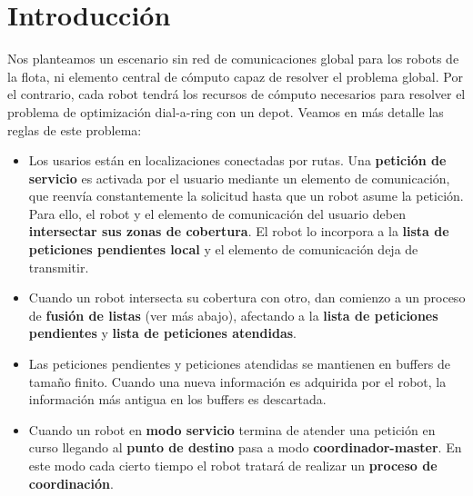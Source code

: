 \documentclass[preprint,12pt]{elsarticle}
\begin{document}
\linenumbers

\section{Introducción}

Nos planteamos un escenario sin red de comunicaciones global para los robots de la flota, ni elemento central de cómputo capaz de resolver el problema global. Por el contrario, cada robot tendrá los recursos de cómputo necesarios para resolver el problema de optimización dial-a-ring con un depot. Veamos en más detalle las reglas de este problema:

\begin{itemize}

\item Los usarios están en localizaciones conectadas por rutas. Una \textbf{petición de servicio} es activada por el usuario mediante un elemento de comunicación, que reenvía constantemente la solicitud hasta que un robot asume la petición. Para ello, el robot y el elemento de comunicación del usuario deben \textbf{intersectar sus zonas de cobertura}. El robot lo incorpora a la \textbf{lista de peticiones pendientes local} y el elemento de comunicación deja de transmitir.

\item Cuando un robot intersecta su cobertura con otro, dan comienzo a un proceso de \textbf{fusión de listas} (ver más abajo), afectando a la \textbf{lista de peticiones pendientes} y \textbf{lista de peticiones atendidas}.

\item Las peticiones pendientes y peticiones atendidas se mantienen en buffers de tamaño finito. Cuando una nueva información es adquirida por el robot, la información más antigua en los buffers es descartada.

\item{Cuando un robot en \textbf{modo servicio} termina de atender una petición en curso llegando al \textbf{punto de destino} pasa a modo \textbf{coordinador-master}. En este modo cada cierto tiempo el robot tratará de realizar un \textbf{proceso de coordinación}.}


\end{itemize}
\end{document}

